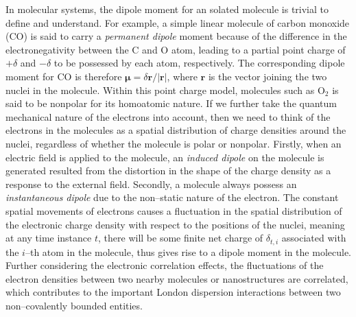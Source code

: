 In molecular systems, the dipole moment for an solated molecule is trivial to define and understand.\cite{stone2013theory} For example, a simple linear molecule of carbon monoxide (CO) is said to carry a \textit{permanent dipole} moment because of the difference in the electronegativity between the C and O atom, leading to a partial point charge of $+\delta$ and $-\delta$ to be possessed by each atom, respectively. The corresponding dipole moment for CO is therefore $\bm{\mu}=\delta\mathbf{r}/|\mathbf{r}|$, where $\mathbf{r}$ is the vector joining the two nuclei in the molecule. Within this point charge model, molecules such as O$_2$ is said to be nonpolar for its homoatomic nature. If we further take  the quantum mechanical nature of the electrons into account, then we need to think of the electrons in the molecules as a spatial distribution of charge densities around the nuclei, regardless of whether the molecule is polar or nonpolar. Firstly, when an electric field is applied to the molecule, an \textit{induced dipole} on the molecule is generated resulted from the distortion in the shape of the charge density as a response to the external field. Secondly, a molecule always possess an \textit{instantaneous dipole} due to the non--static nature of the electron. The constant spatial movements of electrons causes a fluctuation in the spatial distribution of the electronic charge density with respect to the positions of the nuclei, meaning at any time instance $t$, there will be some finite net charge of $\delta_{t,i}$ associated with the $i$--th atom in the molecule, thus gives rise to a dipole moment in the molecule. Further considering the electronic correlation effects, the fluctuations of the electron densities between two nearby molecules\cite{dobson2001prediction} or nanostructures\cite{tawfik2018evaluation} are correlated, which contributes to the important London dispersion interactions\cite{stone2013theory} between two non--covalently bounded entities.

